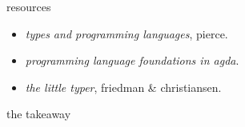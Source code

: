   \begin{frame}{resources}
    \begin{itemize}
      \item \textit{types and programming languages}, pierce.
      \item \textit{programming language foundations in agda}.
      \item \textit{the little typer}, friedman \& christiansen.
    \end{itemize}
  \end{frame}

  \begin{frame}{the takeaway}
  \end{frame}
